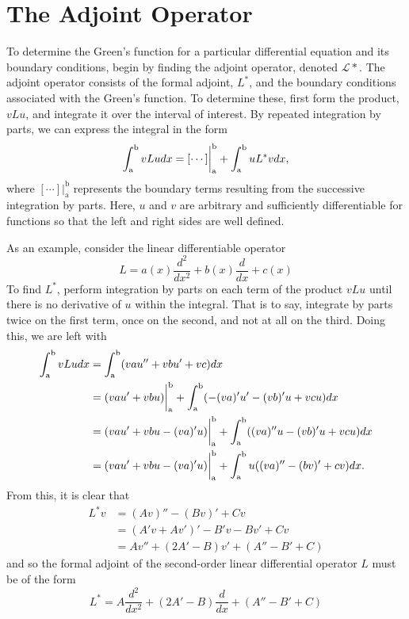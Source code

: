 \section{The Adjoint Operator}
To determine the Green's function for a particular differential equation and its boundary conditions, begin by finding the adjoint operator, denoted \(\mathcal{L*}\). The adjoint operator consists of the formal adjoint, \(L^*\), and the boundary conditions associated with the Green's function. To determine these, first form the product, \(vLu\), and integrate it over the interval of interest. By repeated integration by parts, we can express the integral in the form
\begin{equation} \label{eq:adjoint}
	\int_\mathrm{a}^\mathrm{b} vLu dx = [\cdots]\biggr\rvert_\mathrm{a}^\mathrm{b} + \int_\mathrm{a}^\mathrm{b} uL^*v dx,
\end{equation}
where \([\cdots]\biggr\rvert_\mathrm{a}^\mathrm{b}\) represents the boundary terms resulting from the successive integration by parts. Here, \(u\) and \(v\) are arbitrary and sufficiently differentiable for functions so that the left and right sides are well defined. 

As an example, consider the linear differentiable operator
\begin{equation}
	L= a(x) \frac{d^2}{dx^2} + b(x)\frac{d}{dx} + c(x)
\end{equation}
To find \(L^*\), perform integration by parts on each term of the product \(vLu\) until there is no derivative of \(u\) within the integral. That is to say, integrate by parts twice on the first term, once on the second, and not at all on the third. Doing this, we are left with
\begin{equation}
	\begin{split}
		\int_\mathrm{a}^\mathrm{b} vLu dx &= \int_\mathrm{a}^\mathrm{b} (vau''+ vbu' + vc)dx\\
		&=(vau'+vbu)\biggr\rvert_\mathrm{a}^\mathrm{b} + \int_\mathrm{a}^\mathrm{b} (-(va)'u'-(vb)'u+vcu)dx\\
		&=(vau'+vbu-(va)'u)\biggr\rvert_\mathrm{a}^\mathrm{b} + \int_\mathrm{a}^\mathrm{b} ((va)''u-(vb)'u+vcu)dx\\
		&=(vau'+vbu-(va)'u)\biggr\rvert_\mathrm{a}^\mathrm{b} + \int_\mathrm{a}^\mathrm{b} u((va)''-(bv)'+cv)dx.
	\end{split}
\end{equation}
From this, it is clear that 
\begin{equation}
	\begin{split}
		L^*v &= (Av)''-(Bv)'+Cv\\
		     &= (A'v+Av')'-B'v-Bv'+Cv\\
		     &= Av''+(2A'-B)v'+(A''-B'+C)
	\end{split}
\end{equation}
and so the formal adjoint of the second-order linear differential operator \(L\) must be of the form
\begin{equation}
	L^*=A\frac{d^2}{dx^2} + (2A'-B)\frac{d}{dx}+(A''-B'+C)
\end{equation}



